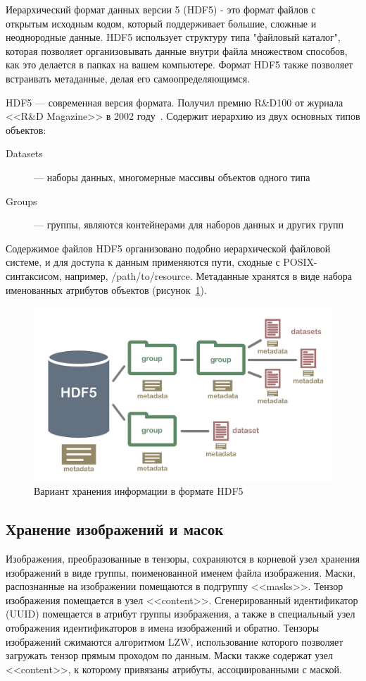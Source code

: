\documentclass[732,fontsize=14pt,final]{studrep}
\begin{document}
Иерархический формат данных версии 5 (HDF5) - это формат файлов с открытым исходным кодом, который поддерживает большие, сложные и неоднородные данные. HDF5 использует структуру типа "файловый каталог", которая позволяет организовывать данные внутри файла множеством способов, как это делается в папках на вашем компьютере. Формат HDF5 также позволяет встраивать метаданные, делая его самоопределяющимся.

HDF5 — современная версия формата. Получил премию R\&D100 от журнала <<R\&D Magazine>> в 2002 году~\cite{hdf5}.
Содержит иерархию из двух основных типов объектов:
\begin{description}
\item [Datasets] — наборы данных, многомерные массивы объектов одного типа
\item [Groups] — группы, являются контейнерами для наборов данных и других групп
\end{description}

Содержимое файлов HDF5 организовано подобно иерархической файловой системе, и для доступа к данным применяются пути, сходные с POSIX-синтаксисом, например, /path/to/resource. Метаданные хранятся в виде набора именованных атрибутов объектов (рисунок~\ref{fig:hdf5-example}).
  \begin{figure}[htp]
    \centering
    \includegraphics[width=0.7\linewidth]{pics/hdf5_structure4.jpg}
    \caption{Вариант хранения информации в формате HDF5}
    \label{fig:hdf5-example}
  \end{figure}

\subsection{Хранение изображений и масок}

Изображения, преобразованные в тензоры, сохраняются в корневой узел хранения изображений в виде группы, поименованной именем файла изображения. Маски, распознанные на изображении помещаются в подгруппу <<masks>>. Тензор изображения помещается в узел <<content>>. Сгенерированный идентификатор (UUID) помещается в атрибут группы изображения, а также в специальный узел отображения идентификаторов в имена изображений и обратно. Тензоры изображений сжимаются алгоритмом LZW, использование которого позволяет загружать тензор прямым проходом по данным. Маски также содержат узел <<content>>, к которому привязаны атрибуты, ассоциированными с маской.
\end{document}

